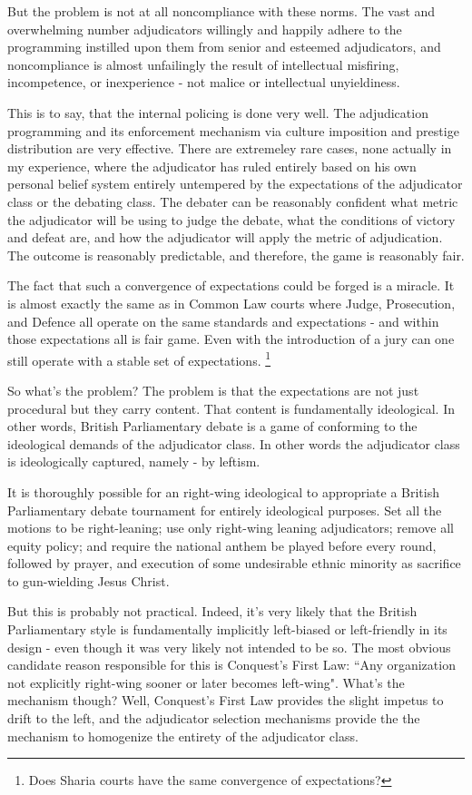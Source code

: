 \begin{itemize}
    But the problem is not at all noncompliance with these norms. The vast and overwhelming number adjudicators willingly and happily adhere to the programming instilled upon them from senior and esteemed adjudicators, and noncompliance is almost unfailingly the result of intellectual misfiring, incompetence, or inexperience - not malice or intellectual unyieldiness.

    This is to say, that the internal policing is done very well. The adjudication programming and its enforcement mechanism via culture imposition and prestige distribution are very effective. There are extremeley rare cases, none actually in my experience, where the adjudicator has ruled entirely based on his own personal belief system entirely untempered by the expectations of the adjudicator class or the debating class. The debater can be reasonably confident what metric the adjudicator will be using to judge the debate, what the conditions of victory and defeat are, and how the adjudicator will apply the metric of adjudication. The outcome is reasonably predictable, and therefore, the game is reasonably fair.

    The fact that such a convergence of expectations could be forged is a miracle. It is almost exactly the same as in Common Law courts where Judge, Prosecution, and Defence all operate on the same standards and expectations - and within those expectations all is fair game. Even with the introduction of a jury can one still operate with a stable set of expectations. 
    \footnote{Does Sharia courts have the same convergence of expectations?}
    
    So what's the problem? The problem is that the expectations are not just procedural but they carry content. That content is fundamentally ideological. In other words, British Parliamentary debate is a game of conforming to the ideological demands of the adjudicator class. In other words the adjudicator class is ideologically captured, namely - by leftism. 

    It is thoroughly possible for an right-wing ideological to appropriate a British Parliamentary debate tournament for entirely ideological purposes. Set all the motions to be right-leaning; use only right-wing leaning adjudicators; remove all equity policy; and require the national anthem be played before every round, followed by prayer, and execution of some undesirable ethnic minority as sacrifice to gun-wielding Jesus Christ. 
    
    But this is probably not practical. Indeed, it's very likely that the British Parliamentary style is fundamentally implicitly left-biased or left-friendly in its design - even though it was very likely not intended to be so. The most obvious candidate reason responsible for this is Conquest's First Law: “Any organization not explicitly right-wing sooner or later becomes left-wing". What's the mechanism though? Well, Conquest's First Law provides the slight impetus to drift to the left, and the adjudicator selection mechanisms provide the the mechanism to homogenize the entirety of the adjudicator class.


\end{itemize}
